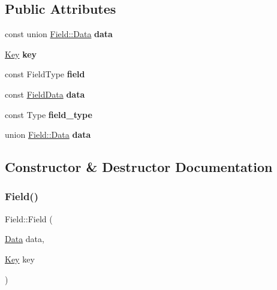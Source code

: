 \subsection*{Public Attributes}
\begin{DoxyCompactItemize}
\item 
\mbox{\label{struct_field_a2e251a573370e077e756a984fa64256e}} 
const union \hyperlink{union_field_1_1_data}{Field\+::\+Data} {\bfseries data}
\item 
\mbox{\label{struct_field_a5f9fc1f0a1b484056c6ad31f424d0486}} 
\hyperlink{struct_key}{Key} {\bfseries key}
\item 
\mbox{\label{struct_field_ad59cb237a80abf85696249b63f963f8f}} 
const Field\+Type {\bfseries field}
\item 
\mbox{\label{struct_field_ac5f5015600d388c8a9b07c17db7de3f0}} 
const \hyperlink{union_field_data}{Field\+Data} {\bfseries data}
\item 
\mbox{\label{struct_field_a301821a927eb0d25fae0b7f6646199a4}} 
const Type {\bfseries field\+\_\+type}
\item 
\mbox{\label{struct_field_a904cabbf52aef88a0e8541db856ee4a7}} 
union \hyperlink{union_field_1_1_data}{Field\+::\+Data} {\bfseries data}
\end{DoxyCompactItemize}


\subsection{Constructor \& Destructor Documentation}
\mbox{\label{struct_field_a6167eb1c3420a4359f0b5bb541f9be94}} 
\subsubsection{\texorpdfstring{Field()}{Field()}}
{\footnotesize\ttfamily Field\+::\+Field (\begin{DoxyParamCaption}\item[{\hyperlink{union_field_1_1_data}{Data}}]{data,  }\item[{\hyperlink{struct_key}{Key}}]{key }\end{DoxyParamCaption})\hspace{0.3cm}{\ttfamily [inline]}}

